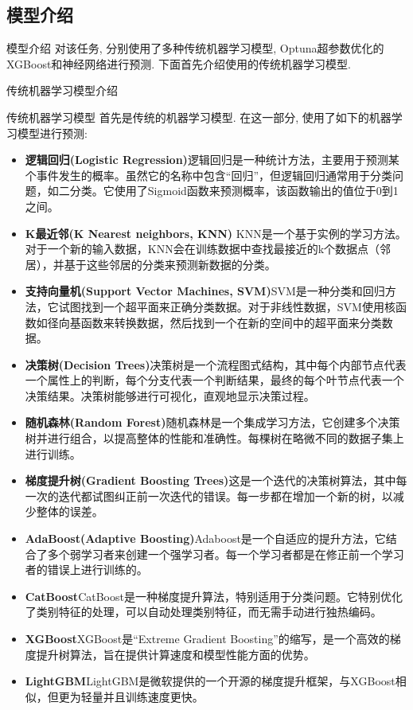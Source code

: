 \documentclass{beamer}
\begin{document}
\subsection{模型介绍}
\begin{frame}[fragile]{模型介绍}
	对该任务, 分别使用了多种传统机器学习模型, Optuna超参数优化的XGBoost和神经网络进行预测. 下面首先介绍使用的传统机器学习模型.
\end{frame}
\begin{frame}[fragile]{传统机器学习模型介绍}
	\begin{block}{传统机器学习模型}
		首先是传统的机器学习模型. 在这一部分, 使用了如下的机器学习模型进行预测:
		\begin{itemize}
			\item<only@1> \textbf{逻辑回归(Logistic Regression)}逻辑回归是一种统计方法，主要用于预测某个事件发生的概率。虽然它的名称中包含“回归”，但逻辑回归通常用于分类问题，如二分类。它使用了Sigmoid函数来预测概率，该函数输出的值位于0到1之间。
			\item<only@1> \textbf{K最近邻(K Nearest neighbors, KNN)} KNN是一个基于实例的学习方法。对于一个新的输入数据，KNN会在训练数据中查找最接近的k个数据点（邻居），并基于这些邻居的分类来预测新数据的分类。
			\item<only@1> \textbf{支持向量机(Support Vector Machines, SVM)}SVM是一种分类和回归方法，它试图找到一个超平面来正确分类数据。对于非线性数据，SVM使用核函数如径向基函数来转换数据，然后找到一个在新的空间中的超平面来分类数据。
			\item<only@1> \textbf{决策树(Decision Trees)}决策树是一个流程图式结构，其中每个内部节点代表一个属性上的判断，每个分支代表一个判断结果，最终的每个叶节点代表一个决策结果。决策树能够进行可视化，直观地显示决策过程。
			\item<only@2> \textbf{随机森林(Random Forest)}随机森林是一个集成学习方法，它创建多个决策树并进行组合，以提高整体的性能和准确性。每棵树在略微不同的数据子集上进行训练。
			\item<only@2> \textbf{梯度提升树(Gradient Boosting Trees)}这是一个迭代的决策树算法，其中每一次的迭代都试图纠正前一次迭代的错误。每一步都在增加一个新的树，以减少整体的误差。
			\item<only@2> \textbf{AdaBoost(Adaptive Boosting)}Adaboost是一个自适应的提升方法，它结合了多个弱学习者来创建一个强学习者。每一个学习者都是在修正前一个学习者的错误上进行训练的。
			\item<only@3> \textbf{CatBoost}CatBoost是一种梯度提升算法，特别适用于分类问题。它特别优化了类别特征的处理，可以自动处理类别特征，而无需手动进行独热编码。
			\item<only@3> \textbf{XGBoost}XGBoost是“Extreme Gradient Boosting”的缩写，是一个高效的梯度提升树算法，旨在提供计算速度和模型性能方面的优势。
			\item<only@3> \textbf{LightGBM}LightGBM是微软提供的一个开源的梯度提升框架，与XGBoost相似，但更为轻量并且训练速度更快。
		\end{itemize}
	\end{block}

\end{frame}
\end{document}
